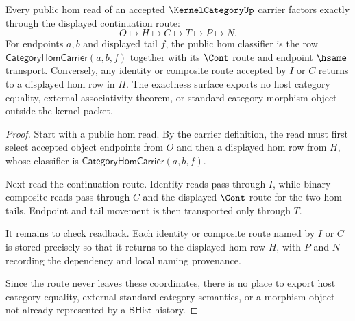 \begin{theorem}
\label{thm:kernel-category-cont-hom-exactness}
Every public hom read of an accepted $\KernelCategoryUp$ carrier factors
exactly through the displayed continuation route:
$$
O \longmapsto H \longmapsto C \longmapsto T \longmapsto P \longmapsto N.
$$
For endpoints $a,b$ and displayed tail $f$, the public hom classifier is the
row $\mathsf{CategoryHomCarrier}(a,b,f)$ together with its $\Cont$ route and
endpoint $\hsame$ transport. Conversely, any identity or composite route
accepted by $I$ or $C$ returns to a displayed hom row in $H$. The exactness
surface exports no host category equality, external associativity theorem, or
standard-category morphism object outside the kernel packet.
\end{theorem}
\begin{proof}
Start with a public hom read. By the carrier definition, the read must first
select accepted object endpoints from $O$ and then a displayed hom row from
$H$, whose classifier is $\mathsf{CategoryHomCarrier}(a,b,f)$.

Next read the continuation route. Identity reads pass through $I$, while
binary composite reads pass through $C$ and the displayed $\Cont$ route for
the two hom tails. Endpoint and tail movement is then transported only through
$T$.

It remains to check readback. Each identity or composite route named by $I$ or
$C$ is stored precisely so that it returns to the displayed hom row $H$, with
$P$ and $N$ recording the dependency and local naming provenance.

Since the route never leaves these coordinates, there is no place to export
host category equality, external standard-category semantics, or a morphism
object not already represented by a $\mathsf{BHist}$ history.
\end{proof}


